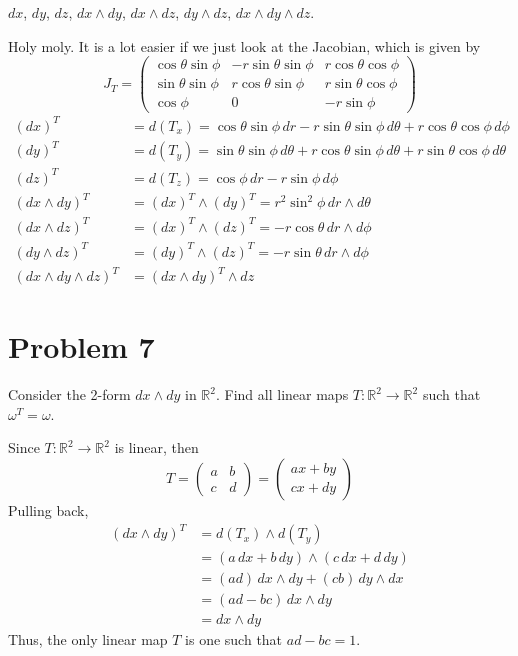 \documentclass[11pt]{article}
\newcommand{\bbR}{\mathbb{R}}
\begin{document}
$dx$, $dy$, $dz$, $dx \wedge dy$, $dx \wedge dz$, $dy \wedge dz$, $dx \wedge dy \wedge dz$.
\begin{solution}
    Holy moly. It is a lot easier if we just look at the Jacobian, which is given by 
    \[J_T = \begin{pmatrix}
    \cos \theta \sin\phi & -r\sin \theta \sin \phi & r\cos \theta \cos \phi\\\sin \theta \sin \phi & r\cos \theta \sin \phi & r\sin \theta \cos \phi\\\cos \phi & 0 & -r\sin \phi
    \end{pmatrix}\]
    \begin{align*}
        (dx)^T &= d(T_x) = \cos \theta \sin\phi \,dr -r\sin \theta \sin\phi \,d\theta + r\cos \theta \cos \phi \, d\phi\\
        (dy)^T &= d(T_y) = \sin \theta \sin \phi \,d\theta +r\cos \theta \sin \phi\,d\theta + r\sin \theta \cos \phi\,d\theta\\
        (dz)^T &= d(T_z) = \cos \phi \,dr - r\sin \phi \, d\phi\\
        (dx \wedge dy)^T &= (dx)^T \wedge (dy)^T = r^2\sin^2 \phi \, dr \wedge d\theta \\
        (dx \wedge dz)^T &= (dx)^T \wedge (dz)^T = -r\cos\theta\, dr\wedge d\phi\\
        (dy \wedge dz)^T &= (dy)^T \wedge (dz)^T = -r\sin\theta \, dr\wedge d\phi\\
        (dx \wedge dy \wedge dz)^T &= (dx\wedge dy)^T \wedge dz 
    \end{align*}
\end{solution}
\newpage

\section*{Problem 7}

Consider the 2-form $dx \wedge dy$ in $\mathbb{R}^2$. Find all linear maps $T : \mathbb{R}^2 \to \mathbb{R}^2$ such that $\omega^T = \omega$.
\begin{solution}
    Since $T: \bbR^2 \to \bbR^2$ is linear, then 
    \[T= \begin{pmatrix}
        a & b\\ c & d
    \end{pmatrix} = \begin{pmatrix}
        ax + by\\
        cx + dy
    \end{pmatrix}\] Pulling back,
    \begin{align*}
    (dx\wedge dy)^T &= d(T_x) \wedge d(T_y)\\&= (a\,dx + b\,dy)\wedge (c\,dx + d\,dy)\\
    &= (ad)\,dx\wedge dy + (cb)\,dy \wedge dx\\
    &= (ad -bc)\,dx\wedge dy\\
    &= dx\wedge dy
    \end{align*}
    Thus, the only linear map $T$ is one such that $ad - bc  =1.$
\end{solution}
\end{document}
